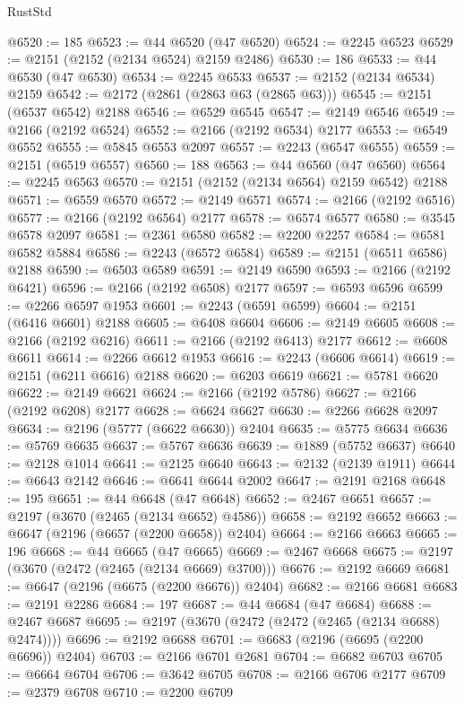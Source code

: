 \begin{lexlean}{RustStd}
\begin{coremodule}
@6520 := 185
@6523 := @44 @6520 (@47 @6520)
@6524 := @2245 @6523
@6529 := @2151 (@2152 (@2134 @6524) @2159 @2486)
@6530 := 186
@6533 := @44 @6530 (@47 @6530)
@6534 := @2245 @6533
@6537 := @2152 (@2134 @6534) @2159
@6542 := @2172 (@2861 (@2863 @63 (@2865 @63)))
@6545 := @2151 (@6537 @6542) @2188
@6546 := @6529 @6545
@6547 := @2149 @6546
@6549 := @2166 (@2192 @6524)
@6552 := @2166 (@2192 @6534) @2177
@6553 := @6549 @6552
@6555 := @5845 @6553 @2097
@6557 := @2243 (@6547 @6555)
@6559 := @2151 (@6519 @6557)
@6560 := 188
@6563 := @44 @6560 (@47 @6560)
@6564 := @2245 @6563
@6570 := @2151 (@2152 (@2134 @6564) @2159 @6542) @2188
@6571 := @6559 @6570
@6572 := @2149 @6571
@6574 := @2166 (@2192 @6516)
@6577 := @2166 (@2192 @6564) @2177
@6578 := @6574 @6577
@6580 := @3545 @6578 @2097
@6581 := @2361 @6580
@6582 := @2200 @2257
@6584 := @6581 @6582 @5884
@6586 := @2243 (@6572 @6584)
@6589 := @2151 (@6511 @6586) @2188
@6590 := @6503 @6589
@6591 := @2149 @6590
@6593 := @2166 (@2192 @6421)
@6596 := @2166 (@2192 @6508) @2177
@6597 := @6593 @6596
@6599 := @2266 @6597 @1953
@6601 := @2243 (@6591 @6599)
@6604 := @2151 (@6416 @6601) @2188
@6605 := @6408 @6604
@6606 := @2149 @6605
@6608 := @2166 (@2192 @6216)
@6611 := @2166 (@2192 @6413) @2177
@6612 := @6608 @6611
@6614 := @2266 @6612 @1953
@6616 := @2243 (@6606 @6614)
@6619 := @2151 (@6211 @6616) @2188
@6620 := @6203 @6619
@6621 := @5781 @6620
@6622 := @2149 @6621
@6624 := @2166 (@2192 @5786)
@6627 := @2166 (@2192 @6208) @2177
@6628 := @6624 @6627
@6630 := @2266 @6628 @2097
@6634 := @2196 (@5777 (@6622 @6630)) @2404
@6635 := @5775 @6634
@6636 := @5769 @6635
@6637 := @5767 @6636
@6639 := @1889 (@5752 @6637)
@6640 := @2128 @1014
@6641 := @2125 @6640
@6643 := @2132 (@2139 @1911)
@6644 := @6643 @2142
@6646 := @6641 @6644 @2002
@6647 := @2191 @2168
@6648 := 195
@6651 := @44 @6648 (@47 @6648)
@6652 := @2467 @6651
@6657 := @2197 (@3670 (@2465 (@2134 @6652) @4586))
@6658 := @2192 @6652
@6663 := @6647 (@2196 (@6657 (@2200 @6658)) @2404)
@6664 := @2166 @6663
@6665 := 196
@6668 := @44 @6665 (@47 @6665)
@6669 := @2467 @6668
@6675 := @2197 (@3670 (@2472 (@2465 (@2134 @6669) @3700)))
@6676 := @2192 @6669
@6681 := @6647 (@2196 (@6675 (@2200 @6676)) @2404)
@6682 := @2166 @6681
@6683 := @2191 @2286
@6684 := 197
@6687 := @44 @6684 (@47 @6684)
@6688 := @2467 @6687
@6695 := @2197 (@3670 (@2472 (@2472 (@2465 (@2134 @6688) @2474))))
@6696 := @2192 @6688
@6701 := @6683 (@2196 (@6695 (@2200 @6696)) @2404)
@6703 := @2166 @6701 @2681
@6704 := @6682 @6703
@6705 := @6664 @6704
@6706 := @3642 @6705
@6708 := @2166 @6706 @2177
@6709 := @2379 @6708
@6710 := @2200 @6709

\end{coremodule}
\end{lexlean}
